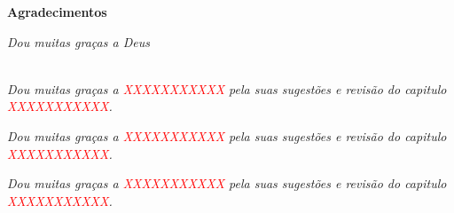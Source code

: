 \cleardoublepage

\begin{center}
\Huge{\textbf{Agradecimentos}}
\end{center}

\null
\vfill
\thispagestyle{empty}

{\normalsize \it \hfill Dou muitas graças a Deus \vspace*{4pt}}


~\\

{\normalsize \it Dou muitas graças a \textcolor{red}{XXXXXXXXXXX} pela 
suas sugestões e revisão  do capitulo \textcolor{red}{XXXXXXXXXXX}.
\vspace*{4pt}}


{\normalsize \it Dou muitas graças a \textcolor{red}{XXXXXXXXXXX} pela 
suas sugestões e revisão  do capitulo \textcolor{red}{XXXXXXXXXXX}.
\vspace*{4pt}}


{\normalsize \it Dou muitas graças a \textcolor{red}{XXXXXXXXXXX} pela 
suas sugestões e revisão  do capitulo \textcolor{red}{XXXXXXXXXXX}.
\vspace*{4pt}}



